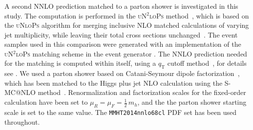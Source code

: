 \subsubsection{\Sherpa \NNLOPS}
\label{sec:hjetscomp:tools:nnlops:sherpa}

A second NNLO prediction matched to a parton shower is investigated 
in this study. The computation is performed in the \textsc{uN$^2$loPs} 
method~\cite{Hoeche:2014aia,Hoche:2014dla}, which is based on the 
\textsc{uNloPs} algorithm for merging inclusive NLO matched calculations 
of varying jet multiplicity, while leaving their total cross sections 
unchanged~\cite{Lonnblad:2012ix,Lonnblad:2012ng}. The event samples 
used in this comparison were generated with an implementation of the 
\textsc{uN$^2$loPs} matching scheme in the event generator \Sherpa. The 
NNLO prediction needed for the matching is computed within \Sherpa itself, 
using a $q_\text{T}$ cutoff method~\cite{Gao:2012ja}, for details see 
\cite{Hoeche:2014aia,Hoche:2014dla}. We used a parton shower based 
on Catani-Seymour dipole factorization~\cite{Schumann:2007mg,Hoeche:2009xc},
which has been matched to the Higgs plus jet NLO calculation using 
the S-MC@NLO method~\cite{Hoeche:2011fd,Hoeche:2012ft}. Renormalization 
and factorization scales for the fixed-order calculation have been 
set to $\mu_R = \mu_F = \tfrac{1}{2}\,m_h$, and the the parton shower 
starting scale is set to the same value. The \texttt{MMHT2014nnlo68cl} 
PDF set \cite{Harland-Lang:2014zoa} has been used throughout.
